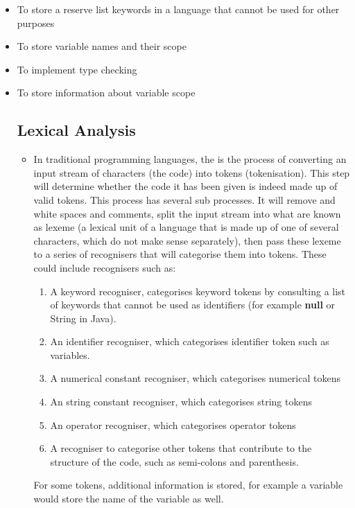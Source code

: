 \documentclass[ %
                    author={Jonathan Rankin},
                supervisor={Dr. David May, Dr. Ian Holyer},
                    degree={MEng},
                     title={CodeTouch},
                  subtitle={A Revolutionary Way To Program Real Code On Touch Screen Devices},
                      type={enterprise},
                      year={2015 } ]{dissertation}
\begin{document}
\begin{itemize}
\item To store a reserve list keywords in a language that cannot be used for other purposes
\item To store variable names and their scope
\item To implement type checking
\item To store information about variable scope

\subsection{Lexical Analysis}

\begin{itemize}
\item[]
In traditional programming languages, the is the process of converting an input stream of characters (the code) into tokens (tokenisation). This step will determine whether the code it has been given is indeed made up of valid tokens. This process has several sub processes. It will remove and white spaces and comments, split the input stream into what are known as lexeme (a lexical unit of a language that is made up of one of several characters, which do not make sense separately), then pass these lexeme to a series of recognisers that will categorise them into tokens. These could include recognisers such as:

\begin{enumerate}
\item A keyword recogniser, categorises keyword tokens by consulting a list of keywords that cannot be used as identifiers (for example \textbf{null} or {String} in Java). 
\item An identifier recogniser, which categorises identifier token such as variables. 
\item A numerical constant recogniser, which categorises numerical tokens
\item An string constant recogniser, which categorises string tokens
\item An operator recogniser, which categorises operator tokens
\item A recogniser to categorise other tokens that contribute to the structure  of the code, such as semi-colons and parenthesis.
\end{enumerate}


For some tokens, additional information is stored, for example a variable would store the name of the variable as well. 


\end{itemize}
\end{itemize}
\end{document}
